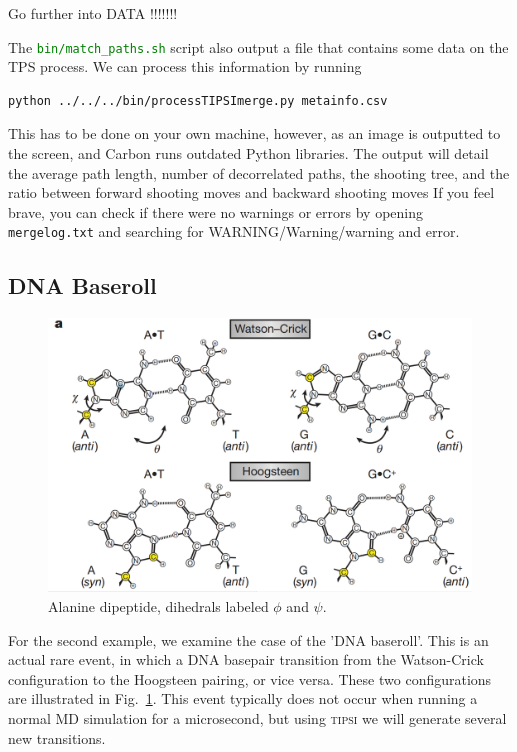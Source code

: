 \documentclass[]{article}
\begin{document}
Go further into DATA
!!!!!!!

The \textcolor{green}{\texttt{bin/match\_paths.sh}} script also output a file that contains some data on the TPS process. We can process this information by running
%
\begin{lstlisting}
python ../../../bin/processTIPSImerge.py metainfo.csv
\end{lstlisting}
% 
This has to be done on your own machine, however, as an image is outputted to the screen, and Carbon runs outdated Python libraries. The output will detail the average path length, number of decorrelated paths, the shooting tree, and the ratio between forward shooting moves and backward shooting moves If you feel brave, you can check if there were no warnings or errors by opening \texttt{mergelog.txt} and searching for WARNING/Warning/warning and error. 

\newpage

\subsection*{DNA Baseroll}

\begin{figure}[ht]
    \centering
    \includegraphics[scale=0.25]{images/pairing.png}
    \caption{Alanine dipeptide, dihedrals labeled $\phi$ and $\psi$.}
    \label{fig:dnabr}
\end{figure}

For the second example, we examine the case of the 'DNA baseroll'. This is an actual rare event, in which a DNA basepair transition from the Watson-Crick configuration to the Hoogsteen pairing, or vice versa. These two configurations are illustrated in Fig.~\ref{fig:dnabr}. This event typically does not occur when running a normal MD simulation for a microsecond, but using \textsc{tipsi} we will generate several new transitions.
\end{document}
